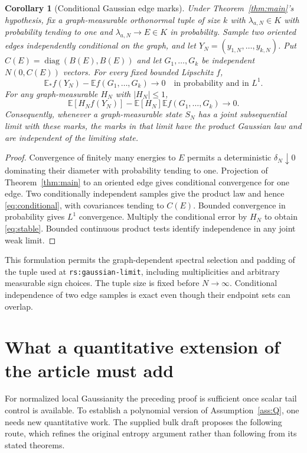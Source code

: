 \documentclass[11pt]{article}
\numberwithin{equation}{section}
\newtheorem{corollary}[theorem]{Corollary}
\theoremstyle{definition}
\theoremstyle{remark}
\newcommand{\E}{\mathbb E}
\begin{document}
\begin{corollary}[Conditional Gaussian edge marks]\label{cor:marks}
Under Theorem~\ref{thm:main}'s hypothesis, fix a graph-measurable
orthonormal tuple of size $k$ with $\lambda_{a,N}\in K$ with probability
tending to one and $\lambda_{a,N}\to E\in K$ in probability.
Sample two oriented edges independently conditional on the
graph, and let $Y_N=(y_{1,N},\ldots,y_{k,N})$. Put
$C(E)=\operatorname{diag}(B(E),B(E))$ and let
$G_1,\ldots,G_k$ be independent $N(0,C(E))$ vectors. For every fixed
bounded Lipschitz $f$,
\begin{equation}\label{eq:conditional}
 \E_*f(Y_N)-\E f(G_1,\ldots,G_k)\longrightarrow0
 \quad\text{in probability and in }L^1.
\end{equation}
For any graph-measurable $H_N$ with $|H_N|\leq1$,
\begin{equation}\label{eq:stable}
 \E[H_N f(Y_N)]-\E[H_N]\E f(G_1,\ldots,G_k)\longrightarrow0.
\end{equation}
Consequently, whenever a graph-measurable state $S_N$ has a joint
subsequential limit with these marks, the marks in that limit have the
product Gaussian law and are independent of the limiting state.
\end{corollary}
\begin{proof}
Convergence of finitely many energies to $E$ permits a deterministic
$\delta_N\downarrow0$ dominating their diameter with probability tending
to one. Projection of Theorem~\ref{thm:main} to an oriented edge gives
conditional convergence for one edge. Two conditionally independent
samples give the product law and hence \eqref{eq:conditional}, with
covariances tending to $C(E)$. Bounded convergence in probability gives
$L^1$ convergence. Multiply the conditional error by $H_N$ to obtain
\eqref{eq:stable}. Bounded continuous product tests identify independence
in any joint weak limit.
\end{proof}
This formulation permits the graph-dependent spectral selection and
padding of the tuple used at \texttt{rs:gaussian-limit}, including
multiplicities and arbitrary measurable sign choices. The tuple size
is fixed before $N\to\infty$. Conditional independence of two edge
samples is exact even though their endpoint sets can overlap.

\section{What a quantitative extension of the article must add}\label{sec:quantitative}
For normalized local Gaussianity the preceding proof is sufficient
once scalar tail control is available. To establish a polynomial
version of Assumption~\ref{ass:Q}, one needs new quantitative work.
The supplied bulk draft proposes the following route, which refines
the original entropy argument rather than following from its stated
theorems.
\end{document}
